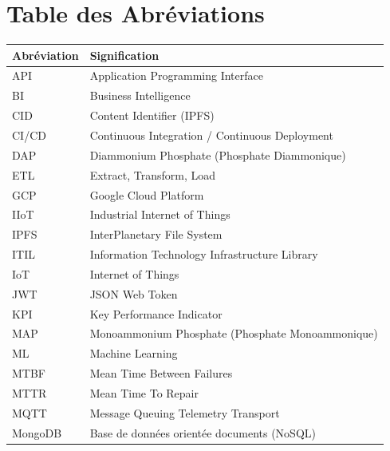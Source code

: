 \documentclass[12pt, a4paper, oneside]{report}
\begin{document}
\chapter*{Table des Abréviations}

\begin{center}
\scriptsize
\begin{tabularx}{\textwidth}{L{3cm} X}
  \toprule
  \textbf{Abréviation} & \textbf{Signification} \\
  \midrule
         API       & Application Programming Interface \\
  BI        & Business Intelligence \\
         CID       & Content Identifier (IPFS) \\
  CI/CD     & Continuous Integration / Continuous Deployment \\
         DAP       & Diammonium Phosphate (Phosphate Diammonique) \\
  ETL       & Extract, Transform, Load \\
         GCP       & Google Cloud Platform \\
  IIoT      & Industrial Internet of Things \\
         IPFS      & InterPlanetary File System \\
  ITIL      & Information Technology Infrastructure Library \\
         IoT       & Internet of Things \\
  JWT       & JSON Web Token \\
         KPI       & Key Performance Indicator \\
  MAP       & Monoammonium Phosphate (Phosphate Monoammonique) \\
         ML        & Machine Learning \\
  MTBF      & Mean Time Between Failures \\
         MTTR      & Mean Time To Repair \\
  MQTT      & Message Queuing Telemetry Transport \\
         MongoDB   & Base de données orientée documents (NoSQL) \\

\end{tabularx}
\end{center}
\end{document}
